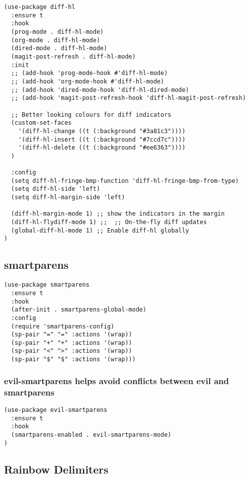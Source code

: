 \documentclass[11pt]{article}
\begin{document}
\begin{verbatim}
(use-package diff-hl
  :ensure t
  :hook
  (prog-mode . diff-hl-mode)
  (org-mode . diff-hl-mode)
  (dired-mode . diff-hl-mode)
  (magit-post-refresh . diff-hl-mode)
  :init
  ;; (add-hook 'prog-mode-hook #'diff-hl-mode)
  ;; (add-hook 'org-mode-hook #'diff-hl-mode)
  ;; (add-hook 'dired-mode-hook 'diff-hl-dired-mode)
  ;; (add-hook 'magit-post-refresh-hook 'diff-hl-magit-post-refresh)

  ;; Better looking colours for diff indicators
  (custom-set-faces
    '(diff-hl-change ((t (:background "#3a81c3"))))
    '(diff-hl-insert ((t (:background "#7ccd7c"))))
    '(diff-hl-delete ((t (:background "#ee6363"))))
  )

  :config
  (setq diff-hl-fringe-bmp-function 'diff-hl-fringe-bmp-from-type)
  (setq diff-hl-side 'left)
  (setq diff-hl-margin-side 'left)

  (diff-hl-margin-mode 1) ;; show the indicators in the margin
  (diff-hl-flydiff-mode 1) ;;  ;; On-the-fly diff updates
  (global-diff-hl-mode 1) ;; Enable diff-hl globally
)
\end{verbatim}

\subsection*{smartparens}
\label{sec:org792d452}
\begin{verbatim}
(use-package smartparens
  :ensure t
  :hook
  (after-init . smartparens-global-mode)
  :config
  (require 'smartparens-config)
  (sp-pair "=" "=" :actions '(wrap))
  (sp-pair "+" "+" :actions '(wrap))
  (sp-pair "<" ">" :actions '(wrap))
  (sp-pair "$" "$" :actions '(wrap)))
\end{verbatim}

\subsubsection*{evil-smartparens helps avoid conflicts between evil and smartparens}
\label{sec:org0a87c98}

\begin{verbatim}
(use-package evil-smartparens
  :ensure t
  :hook
  (smartparens-enabled . evil-smartparens-mode)
)
\end{verbatim}

\subsection*{Rainbow Delimiters}
\label{sec:orge8929e7}
\end{document}
